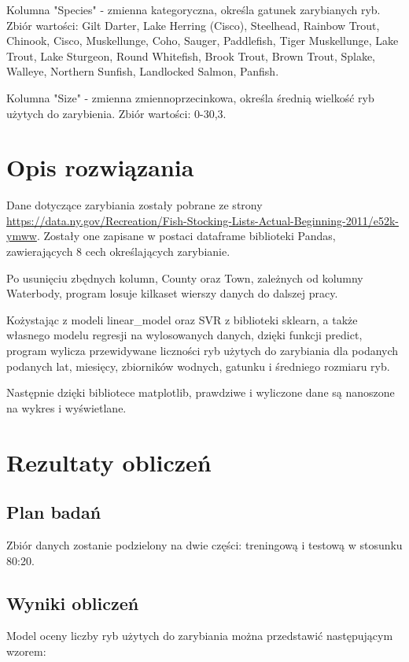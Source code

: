 \documentclass[10pt]{article}
\begin{document}
Kolumna "Species" - zmienna kategoryczna, określa gatunek zarybianych ryb. Zbiór wartości: Gilt Darter, Lake Herring (Cisco), Steelhead, Rainbow Trout, Chinook, Cisco, Muskellunge, Coho, Sauger, Paddlefish, Tiger Muskellunge, Lake Trout, Lake Sturgeon, Round Whitefish, Brook Trout, Brown Trout, Splake, Walleye, Northern Sunfish, Landlocked Salmon, Panfish.

Kolumna "Size" - zmienna zmiennoprzecinkowa, określa średnią wielkość ryb użytych do zarybienia. Zbiór wartości: 0-30,3.

\section{Opis rozwiązania}
Dane dotyczące zarybiania zostały pobrane ze strony\\
\url{https://data.ny.gov/Recreation/Fish-Stocking-Lists-Actual-Beginning-2011/e52k-ymww}.
Zostały one zapisane w postaci dataframe biblioteki Pandas, zawierających 8 cech określających zarybianie.

Po usunięciu zbędnych kolumn, County oraz Town, zależnych od kolumny Waterbody, program losuje kilkaset wierszy danych do dalszej pracy.

Kożystając z modeli linear\_model oraz SVR z biblioteki sklearn, a także własnego modelu regresji na wylosowanych danych, dzięki funkcji predict, program wylicza przewidywane liczności ryb użytych do zarybiania dla podanych podanych lat, miesięcy, zbiorników wodnych, gatunku i średniego rozmiaru ryb.

Następnie dzięki bibliotece matplotlib, prawdziwe i wyliczone dane są nanoszone na wykres i wyświetlane.

\section{Rezultaty obliczeń}

\subsection{Plan badań}
Zbiór danych zostanie podzielony na dwie części: treningową i testową w stosunku 80:20. 

\subsection{Wyniki obliczeń} 
Model oceny liczby ryb użytych do zarybiania można przedstawić następującym wzorem:
\end{document}

